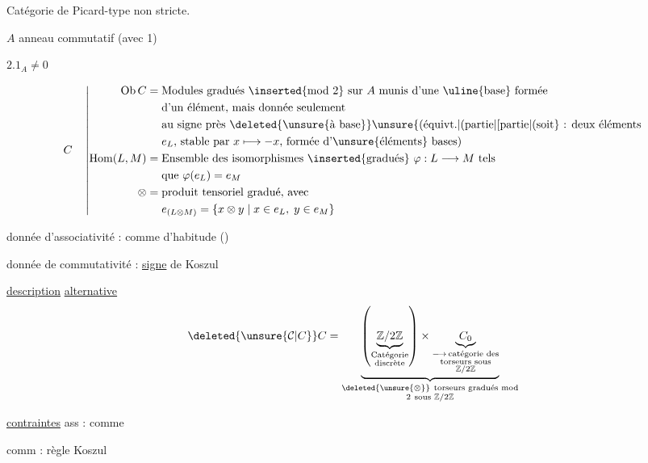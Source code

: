 
Catégorie de Picard-type non stricte.

$A$ anneau commutatif (avec 1)

 $2.1_A\ne 0$

\[
C\quad\left|\begin{aligned}
\operatorname{Ob} C={}&\text{Modules gradués \inserted{mod 2} sur \(A\) munis d'une \uline{base} formée}\\
&\text{d'un élément, mais donnée seulement}\\
&\text{au signe près \deleted{\unsure{à base}}\unsure{(équivt.|(partie|[partie|(soit} : deux éléments}\\
&\text{\(e_L\), stable par \(x\longmapsto-x\), formée d'\unsure{éléments} bases)}\\
\operatorname{Hom}(L,M)={}&\text{Ensemble des isomorphismes \inserted{gradués} \(\varphi:L\longrightarrow M\) tels}\\
&\text{que \(\varphi(e_L)=e_M\)}\\
\otimes={}&\text{produit tensoriel gradué, avec}\\
& e_{(L\otimes M)}=\{x\otimes y\mid x\in e_L,\;y\in e_M\}
\end{aligned}\right.
\]

donnée d'associativité : comme d'habitude  ()

donnée de commutativité : \uline{signe} de Koszul

\uline{description} \uline{alternative}
\[
\deleted{\unsure{\mathcal C|C}}C=
 \underbrace{\left(\underbrace{\mathbb Z/2\mathbb Z}_{\substack{\text{Catégorie}\\\text{discrète}}}\right)
 \times\underbrace{C_0}_{\substack{\longrightarrow\,\text{catégorie des}\\\text{torseurs sous}\\\mathbb Z/2\mathbb Z}}}
 _{\substack{\deleted{\unsure{\otimes}}\ \text{torseurs gradués mod}\\2\ \text{sous }\mathbb Z/2\mathbb Z}}
\]

\uline{contraintes} ass : comme 

\hspace*{3em}comm :  règle Koszul


